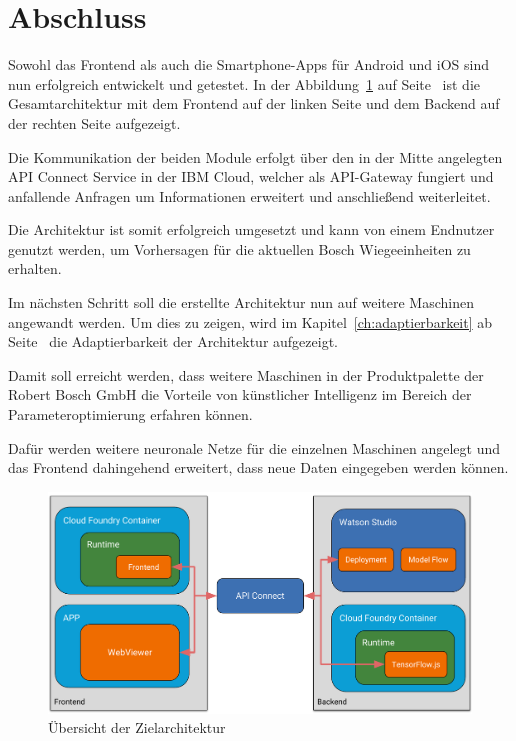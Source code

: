\section{Abschluss}
Sowohl das Frontend als auch die Smartphone-Apps für Android und iOS sind nun erfolgreich entwickelt und getestet. In
der Abbildung~\ref{fig:umsetzung_zielarchitektur_4} auf Seite~\pageref{fig:umsetzung_zielarchitektur_4} ist die
Gesamtarchitektur mit dem Frontend auf der linken Seite und dem Backend auf der rechten Seite aufgezeigt.

Die Kommunikation der beiden Module erfolgt über den in der Mitte angelegten API Connect Service in der IBM Cloud,
welcher als API-Gateway fungiert und anfallende Anfragen um Informationen erweitert und anschließend weiterleitet.

Die Architektur ist somit erfolgreich umgesetzt und kann von einem Endnutzer genutzt werden, um Vorhersagen für die
aktuellen Bosch Wiegeeinheiten zu erhalten.

Im nächsten Schritt soll die erstellte Architektur nun auf weitere Maschinen angewandt werden. Um dies zu zeigen, wird
im Kapitel~\ref{ch:adaptierbarkeit} ab Seite~\pageref{ch:adaptierbarkeit} die Adaptierbarkeit der Architektur
aufgezeigt.

Damit soll erreicht werden, dass weitere Maschinen in der Produktpalette der Robert Bosch GmbH die Vorteile von
künstlicher Intelligenz im Bereich der Parameteroptimierung erfahren können.

Dafür werden weitere neuronale Netze für die einzelnen Maschinen angelegt und das Frontend dahingehend erweitert,
dass neue Daten eingegeben werden können.

\begin{figure}[h]
    \centering
    \includegraphics[width=\textwidth]{images/kapitel_4/architektur_uebersicht.pdf}
    \caption{Übersicht der Zielarchitektur}
    \label{fig:umsetzung_zielarchitektur_4}
\end{figure}
